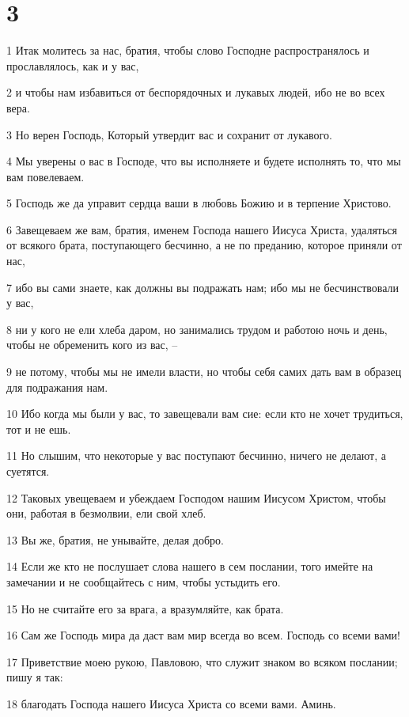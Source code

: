 \chapter{3}

\par 1 Итак молитесь за нас, братия, чтобы слово Господне распространялось и прославлялось, как и у вас,
\par 2 и чтобы нам избавиться от беспорядочных и лукавых людей, ибо не во всех вера.
\par 3 Но верен Господь, Который утвердит вас и сохранит от лукавого.
\par 4 Мы уверены о вас в Господе, что вы исполняете и будете исполнять то, что мы вам повелеваем.
\par 5 Господь же да управит сердца ваши в любовь Божию и в терпение Христово.
\par 6 Завещеваем же вам, братия, именем Господа нашего Иисуса Христа, удаляться от всякого брата, поступающего бесчинно, а не по преданию, которое приняли от нас,
\par 7 ибо вы сами знаете, как должны вы подражать нам; ибо мы не бесчинствовали у вас,
\par 8 ни у кого не ели хлеба даром, но занимались трудом и работою ночь и день, чтобы не обременить кого из вас, --
\par 9 не потому, чтобы мы не имели власти, но чтобы себя самих дать вам в образец для подражания нам.
\par 10 Ибо когда мы были у вас, то завещевали вам сие: если кто не хочет трудиться, тот и не ешь.
\par 11 Но слышим, что некоторые у вас поступают бесчинно, ничего не делают, а суетятся.
\par 12 Таковых увещеваем и убеждаем Господом нашим Иисусом Христом, чтобы они, работая в безмолвии, ели свой хлеб.
\par 13 Вы же, братия, не унывайте, делая добро.
\par 14 Если же кто не послушает слова нашего в сем послании, того имейте на замечании и не сообщайтесь с ним, чтобы устыдить его.
\par 15 Но не считайте его за врага, а вразумляйте, как брата.
\par 16 Сам же Господь мира да даст вам мир всегда во всем. Господь со всеми вами!
\par 17 Приветствие моею рукою, Павловою, что служит знаком во всяком послании; пишу я так:
\par 18 благодать Господа нашего Иисуса Христа со всеми вами. Аминь.


